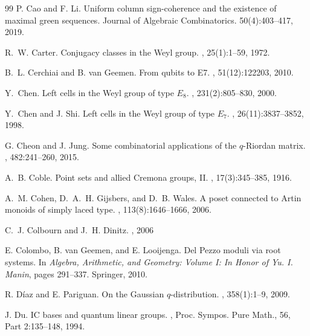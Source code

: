 \documentclass[11pt]{amsart}
\theoremstyle{plain}
\theoremstyle{definition}
\theoremstyle{remark}
\numberwithin{equation}{subsection}
\begin{document}
\begin{thebibliography}{99}
P. Cao and F. Li.
\newblock  Uniform column sign-coherence and the existence of maximal green sequences.
\newblock Journal of Algebraic Combinatorics. 50(4):403–417, 2019.

R.~W. Carter.
\newblock Conjugacy classes in the {W}eyl group.
, 25(1):1--59, 1972.

B.~L. Cerchiai and B. van Geemen.
\newblock From qubits to {E}7.
, 51(12):122203, 2010.

Y.~Chen.
\newblock Left cells in the {W}eyl group of type ${E}_8$.
, 231(2):805--830, 2000.

Y.~Chen and J. Shi.
\newblock Left cells in the {W}eyl group of type ${E}_7$.
, 26(11):3837--3852, 1998.

G. Cheon and J. Jung.
\newblock Some combinatorial applications of the $q$-{R}iordan matrix.
, 482:241--260, 2015.

A.~B. Coble.
\newblock Point sets and allied {C}remona groups, {I}{I}.
,
  17(3):345--385, 1916.

A.~M. Cohen, D.~A.~H. Gijsbers, and D.~B. Wales.
\newblock A poset connected to {A}rtin monoids of simply laced type.
, 113(8):1646--1666,
  2006.

 C.~J. Colbourn and J.~H. Dinitz.
, 2006

E. Colombo, B. van Geemen, and E. Looijenga.
\newblock Del {P}ezzo moduli via root systems.
\newblock In {\em Algebra, Arithmetic, and Geometry: Volume I: In Honor of Yu.
  I. Manin}, pages 291--337. Springer, 2010.

R. Díaz and E. Pariguan.
\newblock On the {G}aussian $q$-distribution.
, 358(1):1--9,
  2009.
  
J. Du.
\newblock IC bases and quantum linear groups.
, Proc. Sympos. Pure Math., 56, Part 2:135--148, 1994.



\end{thebibliography}
\end{document}

